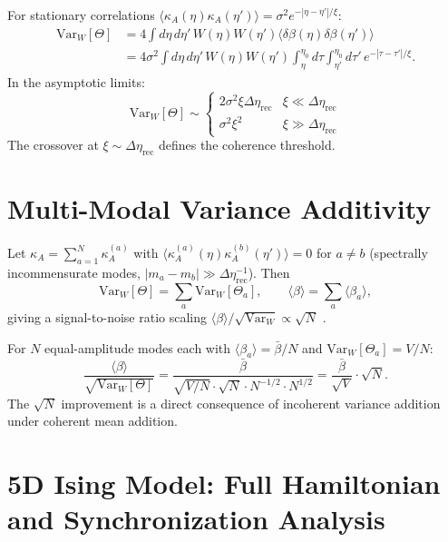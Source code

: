\documentclass[12pt]{article}
\theoremstyle{definition}
\newcommand{\kA}{\kappa_A}
\newcommand{\Wrec}{\Delta\eta_{\mathrm{rec}}}
\newcommand{\VarW}{\mathrm{Var}_W}
\begin{document}
For stationary correlations
$\langle\kA(\eta)\kA(\eta')\rangle=\sigma^2 e^{-|\eta-\eta'|/\xi}$:
\begin{align}
  \VarW[\Theta]
  &= 4\int d\eta\,d\eta'\,W(\eta)W(\eta')
     \langle\delta\beta(\eta)\delta\beta(\eta')\rangle\\
  &= 4\sigma^2
     \int d\eta\,d\eta'\,W(\eta)W(\eta')
     \int_\eta^{\eta_0}d\tau\int_{\eta'}^{\eta_0}d\tau'\,
     e^{-|\tau-\tau'|/\xi}.
\end{align}
In the asymptotic limits:
\begin{equation}
  \VarW[\Theta]\sim\begin{cases}
    2\sigma^2\xi\Wrec & \xi\ll\Wrec\\
    \sigma^2\xi^2 & \xi\gg\Wrec
  \end{cases}
\end{equation}
The crossover at $\xi\sim\Wrec$ defines the coherence threshold.

\section{Multi-Modal Variance Additivity}
\label{app:multimodal}

Let $\kA=\sum_{a=1}^N\kA^{(a)}$ with
$\langle\kA^{(a)}(\eta)\kA^{(b)}(\eta')\rangle=0$ for $a\neq b$
(spectrally incommensurate modes, $|m_a-m_b|\gg\Wrec^{-1}$).
Then
\begin{equation}
  \VarW[\Theta]=\sum_a\VarW[\Theta_a],
  \qquad
  \langle\beta\rangle=\sum_a\langle\beta_a\rangle,
\end{equation}
giving a signal-to-noise ratio scaling $\langle\beta\rangle/\sqrt{\VarW}\propto\sqrt{N}$
\cite{Rice1954,Papoulis1991}.

For $N$ equal-amplitude modes each with $\langle\beta_a\rangle=\bar\beta/N$
and $\VarW[\Theta_a]=V/N$:
\begin{equation}
  \frac{\langle\beta\rangle}{\sqrt{\VarW[\Theta]}}
  = \frac{\bar\beta}{\sqrt{V/N}\cdot\sqrt{N}\cdot N^{-1/2}\cdot N^{1/2}}
  = \frac{\bar\beta}{\sqrt{V}}\cdot\sqrt{N}.
\end{equation}
The $\sqrt{N}$ improvement is a direct consequence of incoherent variance
addition under coherent mean addition.

\section{5D Ising Model: Full Hamiltonian and Synchronization Analysis}
\label{app:ising}
\end{document}
